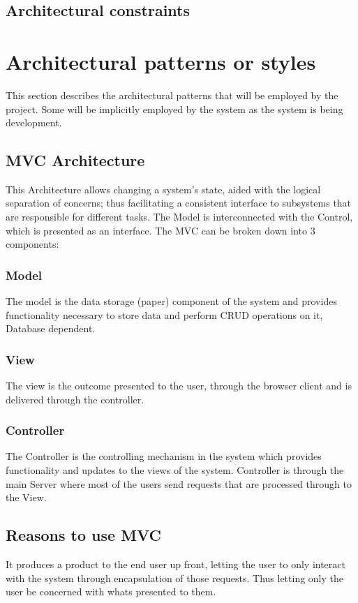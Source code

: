 \documentclass[hidelinks,a4paper,12pt]{article}
\begin{document}
\subsection{Architectural constraints}


\section{Architectural patterns or styles}
This section describes the architectural patterns that will be employed by the project.
Some will be implicitly employed by the system as the system is being development.

\subsection{MVC Architecture }
This Architecture allows changing a system's state, aided with the logical separation
of concerns; thus facilitating a consistent interface to subsystems that are responsible for different tasks.
The Model is interconnected with the Control, which is presented as an interface. The MVC can be broken down into 3 components:
\subsubsection{Model}
The model is the data storage (paper) component of the system and provides functionality 
necessary to store data and perform CRUD operations on it, Database dependent.
\subsubsection{View}
The view is the outcome presented to the user, through the browser client and is delivered through the controller.
\subsubsection{Controller}
The Controller is the controlling mechanism in the system which provides functionality and updates to the views of the 
system. Controller is through the main Server where most of the users send requests that are processed through to the View.



\subsection{Reasons to use MVC}
It produces a product to the end user up front, letting the user to only interact with the system through
encapsulation of those requests. Thus letting only the user be concerned with whats presented to them. 
\end{document}
